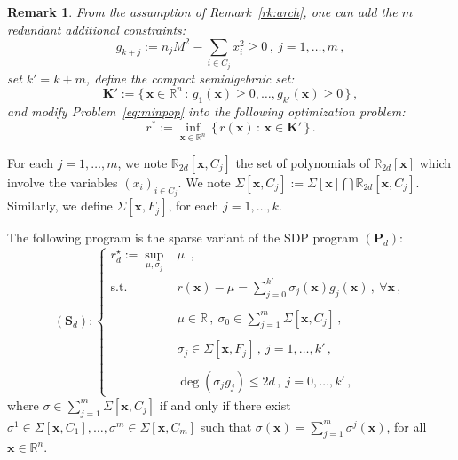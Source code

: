 \documentclass[preprint]{sigplanconf}
\newcommand{\mons}[2]{\N_{#1}^{#2}}
\newcommand{\R}{\mathbb{R}}
\newcommand{\N}{\mathbb{N}}
\newcommand{\x}{\mathbf{x}}
\def\P{\mathbf{P}}
\def\S{\mathbf{S}}
\def\K{\mathbf{K}}
\def\S{\mathbf{S}}
\theoremstyle{plain}
\newtheorem{remark}{Remark}
\begin{document}
\begin{remark}
\label{rk:sparsearch}
From the assumption of Remark~\ref{rk:arch}, one can add the $m$ redundant additional constraints:
\begin{equation}
\label{eq:assum_sos_sparse}
g_{k + j} := n_j M^2 - \sum_{i \in C_j} {x_i^2} \geq 0\,, \  j=1 ,\dots, m \,,
\end{equation}
set $k' = k + m$, define the compact semialgebraic set:
\[\K' := \{\, \x \in \R^n \, : \, g_1 (\x) \geq 0, \dots, g_{k'} (\x) \geq 0 \,\} \,,\]
and modify Problem~\eqref{eq:minpop} into the following optimization problem:
\begin{equation}
\label{eq:sparseminpop}
r^*  :=  \inf_{\x \in \R^n} \, \{ \, r (\x) \, : \, \x \in \K' \, \} \,.
\end{equation}
\end{remark}
For each $j=1 ,\dots,m$, we note $\R_{2 d}[\x, C_j]$ the set of polynomials of $\R_{2 d}[\x]$ which involve the variables $(x_i)_{i \in C_j}$. We note $\Sigma [\x, C_j] := \Sigma [\x] \bigcap \R_{2 d}[\x, C_j]$. Similarly, we define $\Sigma [\x, F_j]$, for each $j=1, \dots, k$.

The following program is the sparse variant of the SDP program $(\P_d)$:
\[
(\S_d):\left\{			
\begin{array}{rl}
r_d^\star := \sup\limits_{\mu, \sigma_j} & \mu\enspace, \\	 
\text{s.t.} & r (\x) - \mu = \sum_{j = 0}^{k'} \sigma_j(\x) g_j(\x) \,, \ \forall \x \,, \\
\\
& \mu\in \R \,,\  \sigma_0 \in \sum_{j = 1}^m \Sigma [\x, C_j] \,, \\
\\
& \sigma_j \in \Sigma[\x, F_j]  \,,\ j = 1,\dots,k' \,, \\
\\
& \deg (\sigma_j g_j) \leq 2 d  \,,\ j = 0,\dots,k' \,,
\end{array} \right.
\]
%
where $\sigma \in \sum_{j = 1}^m \Sigma [\x, C_j]$ if and only if there exist $\sigma^1 \in \Sigma[\x, C_1], \dots, \sigma^m \in \Sigma[\x,C_m]$ such that $\sigma (\x) = \sum_{j = 1}^m \sigma^j (\x)$, for all $\x \in \R^n$.
%
\end{document}
